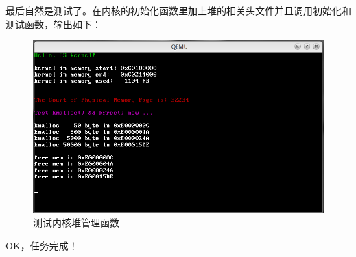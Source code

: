 \par 最后自然是测试了。在内核的初始化函数里加上堆的相关头文件并且调用初始化和测试函数，输出如下：

\begin{figure}[ht]
      \centering
      \includegraphics[scale=0.6]{picture/chapt11/HEAP_TEST.png}
      \caption{测试内核堆管理函数}
\end{figure}

\par OK，任务完成！
